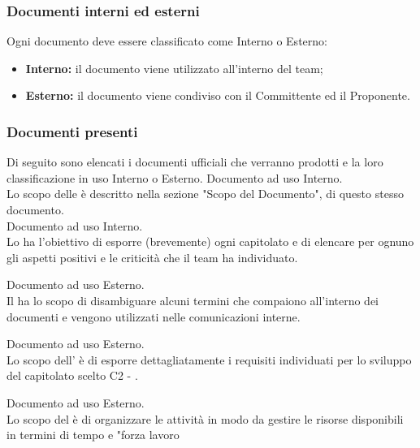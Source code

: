     \subsubsection{Documenti interni ed esterni}
      Ogni documento deve essere classificato come Interno o Esterno:
      \begin{itemize}
        \item \textbf{Interno:} il documento viene utilizzato all'interno del team;
        \item \textbf{Esterno:} il documento viene condiviso con il Committente ed il Proponente.
      \end{itemize}

    \subsubsection{Documenti presenti}
      Di seguito sono elencati i documenti ufficiali che verranno prodotti e la loro classificazione in uso Interno o Esterno.
        Documento ad uso Interno.\\
        Lo scopo delle \textit{\NdP{}} è descritto nella sezione  "Scopo del Documento", di questo stesso documento.\\

        Documento ad uso Interno.\\
        Lo \textit{\SdF{}} ha l'obiettivo di esporre (brevemente) ogni capitolato e di elencare per ognuno gli aspetti positivi e le criticità che il team ha individuato.

        Documento ad uso Esterno.\\
       	Il \Glossario{}  ha lo scopo di disambiguare alcuni termini che compaiono all'interno dei documenti e vengono utilizzati nelle comunicazioni interne.

        Documento ad uso Esterno.\\
        Lo  scopo  dell'\textit{\AdR{}} è di esporre dettagliatamente i requisiti individuati per lo sviluppo del capitolato scelto C2 - \NomeProgetto{}.

        Documento ad uso Esterno.\\
        Lo scopo del \textit{\PdP{}} è di organizzare le attività in modo da gestire le risorse disponibili in termini di tempo e "forza lavoro

